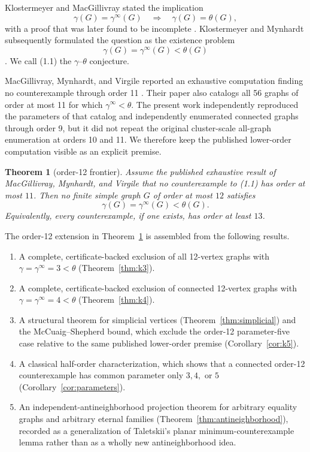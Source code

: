 \documentclass[11pt]{article}
\newtheorem{theorem}{Theorem}[section]
\theoremstyle{definition}
\theoremstyle{remark}
\newcommand{\gaminf}{\gamma^{\infty}}
\begin{document}
Klostermeyer and MacGillivray stated the implication
\[
  \gamma(G)=\gaminf(G)\quad\Longrightarrow\quad
  \gamma(G)=\theta(G),
\tag{1.1}
\]
with a proof that was later found to be incomplete
\cite{KlostermeyerMacGillivray2009,KlostermeyerMynhardt2015}.
Klostermeyer and Mynhardt subsequently formulated the question as the
existence problem
\[
  \gamma(G)=\gaminf(G)<\theta(G)
\tag{1.2}
\]
\cite{KlostermeyerMynhardt2015,KlostermeyerMynhardt2016}.  We call (1.1)
the \(\gamma\)--\(\theta\) conjecture.

MacGillivray, Mynhardt, and Virgile reported an exhaustive computation
finding no counterexample through order 11
\cite[Observation 5.6]{MacGillivrayMynhardtVirgile2022}.  Their paper also
catalogs all 56 graphs of order at most 11 for which
\(\gaminf<\theta\).  The present work independently reproduced the
parameters of that catalog and independently enumerated connected graphs
through order 9, but it did not repeat the original cluster-scale
all-graph enumeration at orders 10 and 11.  We therefore keep the
published lower-order computation visible as an explicit premise.

\begin{theorem}[order-12 frontier]\label{thm:frontier}
Assume the published exhaustive result of MacGillivray, Mynhardt, and
Virgile that no counterexample to \emph{(1.1)} has order at most \(11\).
Then no finite simple graph \(G\) of order at most \(12\) satisfies
\[
  \gamma(G)=\gaminf(G)<\theta(G).
\]
Equivalently, every counterexample, if one exists, has order at least \(13\).
\end{theorem}

The order-12 extension in Theorem~\ref{thm:frontier} is assembled from the
following results.

\begin{enumerate}
\item A complete, certificate-backed exclusion of all 12-vertex graphs with
      \(\gamma=\gaminf=3<\theta\) (Theorem~\ref{thm:k3}).
\item A complete, certificate-backed exclusion of connected 12-vertex
      graphs with \(\gamma=\gaminf=4<\theta\)
      (Theorem~\ref{thm:k4}).
\item A structural theorem for simplicial vertices
      (Theorem~\ref{thm:simplicial}) and the McCuaig--Shepherd bound, which
      exclude the order-12 parameter-five case relative to the same
      published lower-order premise (Corollary~\ref{cor:k5}).
\item A classical half-order characterization, which shows that a connected
      order-12 counterexample has common parameter only \(3,4,\) or \(5\)
      (Corollary~\ref{cor:parameters}).
\item An independent-antineighborhood projection theorem for arbitrary
      equality graphs and arbitrary eternal families
      (Theorem~\ref{thm:antineighborhood}), recorded as a generalization of
      Taletskii's planar minimum-counterexample lemma rather than as a
      wholly new antineighborhood idea.
\end{enumerate}
\end{document}
